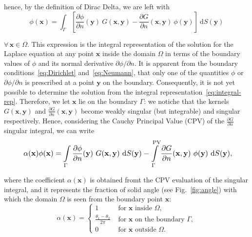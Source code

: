 hence, by the definition of Dirac Delta, we are left with
\begin{equation}
\label{eq:integral-rep}
\phi(\mathbf{x}) = \int_{\Gamma} \left[ \frac{\partial \phi}{\partial n}(\mathbf{y})\ G(\mathbf{x},\mathbf{y}) - \frac{\partial G}{\partial n}(\mathbf{x},\mathbf{y})\ \phi(\mathbf{y}) \right]\!\! \ \mathrm{d}S(\mathbf{y})
\end{equation}

$\forall\, \mathbf{x} \in\Omega$. This expression is the integral representation of the solution for the Laplace equation at any point $\mathbf{x}$ inside the domain $\Omega$ in terms of the boundary values of $\phi$ and its normal derivative ${\partial \phi}/{\partial n}$. It is apparent from the boundary conditions~\eqref{eq:Dirichlet} and~\eqref{eq:Neumann}, that only one of the quantities $\phi$ or $\partial\phi/\partial n$ is prescribed at a point $\mathbf{y}$ on the boundary.  Consequently, it is not yet possible to determine the solution from the integral representation~\eqref{eq:integral-rep}. Therefore, we let $\mathbf{x}$ lie on the boundary $\Gamma$: we notiche that the kernels $G(\mathbf{x},\mathbf{y})$ and $\frac{\partial G}{\partial n}(\mathbf{x},\mathbf{y})$ become weakly singular (but integrable) and singular respectively. Hence, considering the Cauchy Principal Value (CPV) of the $\frac{\partial G}{\partial n}$ singular integral, we can write
\begin{equation}
\label{eq:solid-angle}
\resizebox{.9\hsize}{!}{
$\alpha(\mathbf{x})\phi(\mathbf{x}) = \displaystyle\int_{\Gamma} \frac{\partial \phi}{\partial n}(\mathbf{y})\ G(\mathbf{x},\mathbf{y})\ \mathrm{d}S(\mathbf{y}) - \int_{\Gamma}^{\text{PV}} \frac{\partial G}{\partial n}(\mathbf{x},\mathbf{y})\ \phi(\mathbf{y}) \ \mathrm{d}S(\mathbf{y}),$}
\end{equation}

where the coefficient $\alpha(\mathbf{x})$ is obtained fromt the CPV evaluation of the singular integral, and it represents the fraction of solid angle (see Fig.~\ref{fig:angle}) with which the domain $\Omega$ is seen from the boundary point $\mathbf{x}$:
\begin{equation*}
\alpha(\mathbf{x})=
\begin{cases}
1 &\text{ for } \mathbf{x} \text{ inside } \Omega, \\ 
\textstyle\frac{\theta_1-\theta_2}{2\pi} &\text{ for } \mathbf{x} \text{ on the boundary } \Gamma, \\
0 &\text{ for } \mathbf{x} \text{ outside } \Omega.
\end{cases}
\end{equation*}

